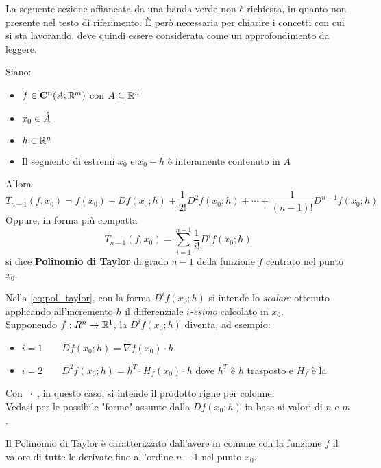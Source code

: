 \vspace*{\baselineskip}
\cbstart
La seguente sezione affiancata da una banda verde non è richiesta, in quanto non presente nel testo di riferimento. È però necessaria per chiarire i concetti con cui si sta lavorando, deve quindi essere considerata come un approfondimento da leggere.
\begin{definition}
	\label{def:pol_taylor}
	Siano:
	\begin{itemize}[noitemsep]
		\item $f \in \mathbf{C^{n}}(A;\mathbb{R}^m)$ con $A \subseteq \mathbb{R}^n$
		\item $x_0 \in \accentset{\circ}{A}$
		\item $h \in \mathbb{R}^n$
		\item Il segmento di estremi $x_0$ e $x_0 + h$ è interamente contenuto in $A$
	\end{itemize}
	Allora
	\[T_{n-1}(f, x_0) = f(x_0) + Df(x_0; h) + \frac{1}{2!} D^2f(x_0; h) + \cdots + \frac{1}{(n-1)!} D^{n-1}f(x_0; h)\]
	Oppure, in forma più compatta
	\begin{equation}
		\label{eq:pol_taylor}
			T_{n-1}(f, x_0) = \sum\limits_{i = 1}^{n-1} \frac{1}{i!} D^if(x_0; h)
	\end{equation}
	si dice \textbf{Polinomio di Taylor} di grado $n-1$ della funzione $f$ centrato nel punto $x_0$.

	\begin{note}
		Nella \cref{eq:pol_taylor}, con la forma $D^if(x_0; h)$ si intende lo \textit{scalare} ottenuto applicando all’incremento $h$ il differenziale $i$\textit{-esimo} calcolato in $x_0$.\\
		Supponendo $f: R^n \to \mathbb{R}^1$, la $D^if(x_0; h)$ diventa, ad esempio:
		\begin{itemize}
			\item $i = 1 \qquad Df(x_0; h) = \nabla f(x_0) \cdot h$
			\item $i = 2 \qquad D^2f(x_0; h) = h^T \cdot H_f(x_0) \cdot h$ \quad dove $h^T$ è $h$ trasposto e $H_f$ è la 
		\end{itemize}
		Con $\; \cdot \;$, in questo caso, si intende il prodotto righe per colonne.\\
		Vedasi  per le possibile "forme" assunte dalla $Df(x_0; h)$ in base ai valori di $n$ e $m$.
	\end{note}
\end{definition}
\begin{observation}
	Il Polinomio di Taylor è caratterizzato dall’avere in comune con la funzione $f$ il valore di tutte le derivate fino all’ordine $n-1$ nel punto $x_0$.
\end{observation}
